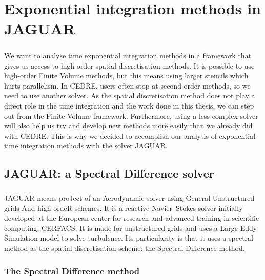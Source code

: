 \chapter{Exponential integration methods in JAGUAR}

  \paragraph{}
  We want to analyse time exponential integration methods in a framework that gives us access to high-order spatial discretisation methods.
  It is possible to use high-order Finite Volume methods, but this means using larger stencils which hurts parallelism.
  In CEDRE, users often stop at second-order methods, so we need to use another solver.
  As the spatial discretisation method does not play a direct role in the time integration and the work done in this thesis, we can step out from the Finite Volume framework.
  Furthermore, using a less complex solver will also help us try and develop new methods more easily than we already did with CEDRE.
  This is why we decided to accomplish our analysis of exponential time integration methods with the solver JAGUAR.


  \section{JAGUAR: a Spectral Difference solver}

    \paragraph{}
    JAGUAR means proJect of an Aerodynamic solver using General Unstructured grids And high ordeR schemes.
    It is a reactive Navier--Stokes solver initially developed at the European center for research and advanced training in scientific computing: CERFACS.
    It is made for unstructured grids and uses a Large Eddy Simulation model to solve turbulence.
    Its particularity is that it uses a spectral method as the spatial discretisation scheme: the Spectral Difference method.


    \subsection{The Spectral Difference method}

